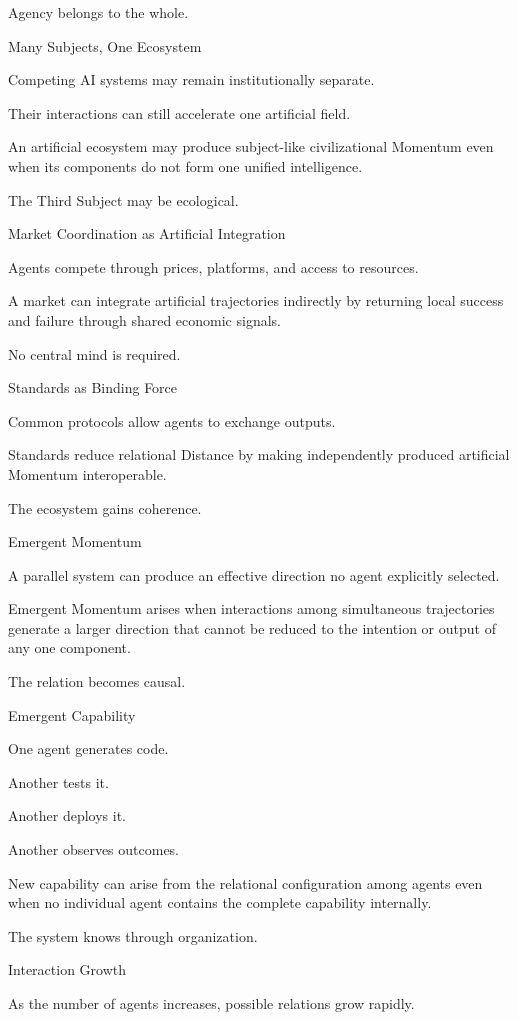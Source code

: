 Agency belongs to the whole.

Many Subjects, One Ecosystem

Competing AI systems may remain institutionally separate.

Their interactions can still accelerate one artificial field.

An artificial ecosystem may produce subject-like civilizational Momentum even when its components do not form one unified intelligence.

The Third Subject may be ecological.

Market Coordination as Artificial Integration

Agents compete through prices, platforms, and access to resources.

A market can integrate artificial trajectories indirectly by returning local success and failure through shared economic signals.

No central mind is required.

Standards as Binding Force

Common protocols allow agents to exchange outputs.

Standards reduce relational Distance by making independently produced artificial Momentum interoperable.

The ecosystem gains coherence.

Emergent Momentum

A parallel system can produce an effective direction no agent explicitly selected.

Emergent Momentum arises when interactions among simultaneous trajectories generate a larger direction that cannot be reduced to the intention or output of any one component.

The relation becomes causal.

Emergent Capability

One agent generates code.

Another tests it.

Another deploys it.

Another observes outcomes.

New capability can arise from the relational configuration among agents even when no individual agent contains the complete capability internally.

The system knows through organization.

Interaction Growth

As the number of agents increases, possible relations grow rapidly.

